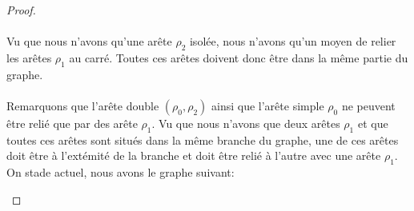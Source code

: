 \begin{proof}
\paragraph{}
Vu que nous n'avons qu'une arête $\rho_2$ isolée, nous n'avons qu'un moyen de relier les arêtes $\rho_1$ au carré. Toutes ces arêtes doivent donc être dans la même partie du graphe.

\paragraph{}
Remarquons que l'arête double $(\rho_0, \rho_2)$ ainsi que l'arête simple $\rho_0$ ne peuvent être relié que par des arête $\rho_1$. Vu que nous n'avons que deux arêtes $\rho_1$ et que toutes ces arêtes sont situés dans la même branche du graphe, une de ces arêtes doit être à l'extémité de la branche et doit être relié à l'autre avec une arête $\rho_1$. On stade actuel, nous avons le graphe suivant:

\begin{figure}[H]
  \begin{center}
\end{center}
\end{figure}
\end{proof}
